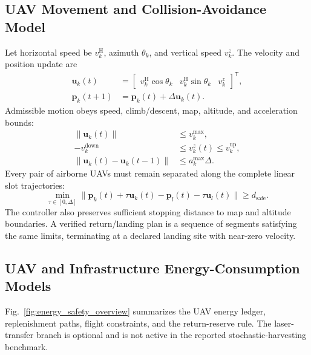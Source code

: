 \subsection{UAV Movement and Collision-Avoidance Model}
Let horizontal speed be $v_k^{\mathrm H}$, azimuth $\theta_k$, and
vertical speed $v_k^z$. The velocity and position update are
\begin{equation}
\begin{aligned}
\boldsymbol u_k(t)&=
\begin{bmatrix}
v_k^{\mathrm H}\cos\theta_k&
v_k^{\mathrm H}\sin\theta_k&v_k^z
\end{bmatrix}^{\mathsf T},\\
\boldsymbol p_k(t+1)&=\boldsymbol p_k(t)+\Delta\boldsymbol u_k(t).
\end{aligned}
\label{eq:uav_motion}
\end{equation}
Admissible motion obeys speed, climb/descent, map, altitude, and
acceleration bounds:
\begin{equation}
\begin{aligned}
\|\boldsymbol u_k(t)\|&\le v_k^{\max},\\
-v_k^{\mathrm{down}}&\le v_k^z(t)\le v_k^{\mathrm{up}},\\
\|\boldsymbol u_k(t)-\boldsymbol u_k(t-1)\|&\le a_k^{\max}\Delta.
\end{aligned}
\label{eq:flight_bounds}
\end{equation}
Every pair of airborne UAVs must remain separated along the complete
linear slot trajectories:
\begin{equation}
\min_{\tau\in[0,\Delta]}
\|\boldsymbol p_k(t)+\tau\boldsymbol u_k(t)
-\boldsymbol p_l(t)-\tau\boldsymbol u_l(t)\|
\ge d_{\mathrm{safe}}.
\label{eq:collision}
\end{equation}
The controller also preserves sufficient stopping distance to map and
altitude boundaries. A verified return/landing plan is a sequence of
segments satisfying the same limits, terminating at a declared landing
site with near-zero velocity.

\subsection{UAV and Infrastructure Energy-Consumption Models}
Fig.~\ref{fig:energy_safety_overview} summarizes the UAV energy ledger,
replenishment paths, flight constraints, and the return-reserve rule. The
laser-transfer branch is optional and is not active in the reported
stochastic-harvesting benchmark.

